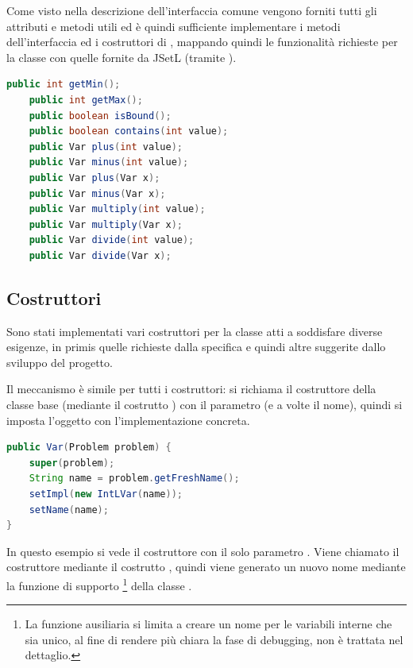 Come visto nella descrizione dell'interfaccia comune vengono forniti tutti gli
attributi e metodi utili ed è quindi sufficiente implementare i metodi
dell'interfaccia  ed i costruttori di ,
mappando quindi le funzionalità richieste per la classe 
con quelle fornite da JSetL (tramite ).

\begin{lstlisting}[language = Java,
                   frame = single,
                   caption = {metodi di Var},
                   label = metodiVar]
        public int getMin();
	public int getMax(); 
	public boolean isBound();
	public boolean contains(int value);
	public Var plus(int value);
	public Var minus(int value);
	public Var plus(Var x);
	public Var minus(Var x); 
	public Var multiply(int value);
	public Var multiply(Var x);
	public Var divide(int value);
	public Var divide(Var x);
\end{lstlisting}

\subsection{Costruttori}
Sono stati implementati vari costruttori per la classe  atti
a soddisfare diverse esigenze, in primis quelle richieste dalla specifica e 
quindi altre suggerite dallo sviluppo del progetto.

Il meccanismo è simile per tutti i costruttori: si richiama il costruttore
della classe base (mediante il costrutto ) con il
parametro  (e a volte il nome), quindi si imposta l'oggetto
 con l'implementazione concreta.
 
\begin{lstlisting}[language = Java,
                   caption = {un costruttore di \files{Var}.}]
public Var(Problem problem) {
	super(problem);
	String name = problem.getFreshName();
	setImpl(new IntLVar(name));
	setName(name);
}
\end{lstlisting}
In questo esempio si vede il costruttore con il solo parametro .
Viene chiamato il costruttore  mediante il
costrutto , quindi viene generato un nuovo nome mediante
la funzione di 
supporto \footnote{\samepage La funzione ausiliaria 
 si limita a
creare un nome per le variabili interne che sia unico, al fine di rendere più
chiara la fase di debugging, non è trattata nel dettaglio.} della 
classe .

